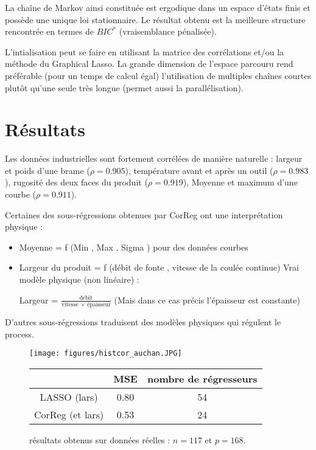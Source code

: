 \documentclass[12pt]{article}
\begin{document}
		La chaîne de Markov ainsi constituée est ergodique dans un espace d'états finis et possède une unique loi stationnaire.
		Le résultat obtenu est la meilleure structure rencontrée en termes de $BIC^*$ (vraisemblance pénalisée). 
 
L'intialisation peut se faire en utilisant la matrice des corrélations et/ou la méthode du Graphical Lasso\cite{friedman2008sparse}.		
La grande dimension de l'espace parcouru rend préférable  (pour un temps de calcul égal) l'utilisation de multiples chaînes courtes plutôt qu'une seule très longue (permet aussi la parallélisation).

\section{Résultats}	
Les données industrielles sont fortement corrélées de manière naturelle : largeur et poids d'une brame ($\rho=0.905$), température avant et après un outil ($\rho=0.983$), rugosité des deux faces du produit ($\rho=0.919$), Moyenne et maximum d'une courbe ($\rho=0.911$).
			
Certaines des sous-régressions obtenues par CorReg ont une interprétation physique :
\begin{itemize}
	\item Moyenne = f (Min , Max , Sigma ) pour des données courbes
	\item Largeur du produit = f (débit de fonte , vitesse de la coulée continue)	
Vrai modèle physique (non linéaire) :

	 Largeur = $\frac{\textrm{débit}}{\textrm{vitesse } \times \textrm{ épaisseur}}$ (Mais dans ce cas précis l'épaisseur est constante)
			\end{itemize}
			
			D'autres sous-régressions traduisent des modèles physiques qui régulent le process.


\begin{figure}[!h]
	\begin{minipage}[c]{.40\linewidth}
			\texttt{[image: figures/histcor\_auchan.JPG]} 
	\end{minipage} \hfill
   \begin{minipage}[c]{.52\linewidth}
		\begin{tabular}{|c|c|c|}
		\hline 
		  & MSE  & nombre de régresseurs  \\ 
		\hline
		LASSO (lars) & 0.80 & 54 \\ 
		\hline 
		CorReg (et lars) & 0.53 & 24  \\ 
		\hline 
		\end{tabular} 
   \end{minipage}
   \caption{résultats obtenus sur données réelles : $n=117$ et $p=168$.    }
\end{figure}   
	
\end{document}
